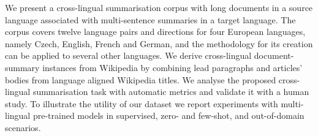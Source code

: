 We present a cross-lingual summarisation corpus with long documents in a source language associated with multi-sentence summaries in a target language.  The corpus covers twelve language pairs and directions for four European languages, namely Czech, English, French and German, and the methodology for its creation can be applied to several other languages.  We derive cross-lingual document-summary instances from Wikipedia by combining lead paragraphs and articles' bodies from language aligned Wikipedia titles.  We analyse the proposed cross-lingual summarisation task with automatic metrics and validate it with a human study.  To illustrate the utility of our dataset we report experiments with multi-lingual pre-trained models in supervised, zero- and few-shot, and out-of-domain scenarios.
